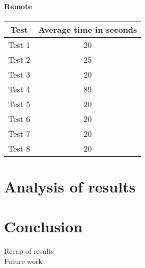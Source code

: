 \subsubsection{Remote}
\begin{center}
    \begin{tabular}{| c | c |}
    \hline
    Test & Average time in seconds \\ \hline
    Test 1 & 20 \\ \hline
    Test 2 & 25 \\ \hline
    Test 3 & 20 \\ \hline
    Test 4 & 89 \\ \hline
    Test 5 & 20 \\ \hline
    Test 6 & 20 \\ \hline
    Test 7 & 20 \\ \hline
    Test 8 & 20 \\ \hline
    \end{tabular}
\end{center}

\chapter{Analysis of results}
\label{results}

\chapter{Conclusion}
\label{conclusion}
Recap of results
\\
Future work


